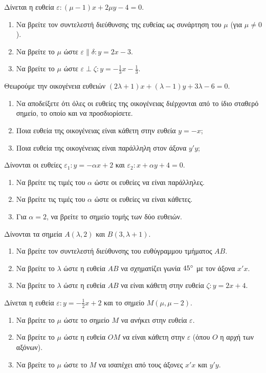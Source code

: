 \documentclass[11pt,a4paper,modern]{FFExercises}
\begin{document}
\askhsh
Δίνεται η ευθεία $ \varepsilon: (\mu-1)x + 2\mu y - 4 = 0 $.
\begin{enumerate}[itemsep=0mm,label=\alph*.]
	\item Να βρείτε τον συντελεστή διεύθυνσης της ευθείας ως συνάρτηση του $\mu$ (για $\mu \neq 0$).
	\item Να βρείτε το $\mu$ ώστε $ \varepsilon \parallel \delta: y = 2x - 3 $.
	\item Να βρείτε το $\mu$ ώστε $ \varepsilon \perp \zeta: y = -\frac{1}{3}x - \frac{1}{3} $.
\end{enumerate}

\askhsh
Θεωρούμε την οικογένεια ευθειών $ (2\lambda+1)x + (\lambda-1)y + 3\lambda - 6 = 0 $.
\begin{enumerate}[itemsep=0mm,label=\alph*.]
	\item Να αποδείξετε ότι όλες οι ευθείες της οικογένειας διέρχονται από το ίδιο σταθερό σημείο, το οποίο και να προσδιορίσετε.
	\item Ποια ευθεία της οικογένειας είναι κάθετη στην ευθεία $ y = -x $;
	\item Ποια ευθεία της οικογένειας είναι παράλληλη στον άξονα $y'y$;
\end{enumerate}

\askhsh
Δίνονται οι ευθείες $ \varepsilon_1: y = -\alpha x + 2 $ και $ \varepsilon_2: x + \alpha y + 4 = 0 $.
\begin{enumerate}[itemsep=0mm,label=\alph*.]
	\item Να βρείτε τις τιμές του $\alpha$ ώστε οι ευθείες να είναι παράλληλες.
	\item Να βρείτε τις τιμές του $\alpha$ ώστε οι ευθείες να είναι κάθετες.
	\item Για $ \alpha = 2 $, να βρείτε το σημείο τομής των δύο ευθειών.
\end{enumerate}

\askhsh
Δίνονται τα σημεία $ A(\lambda, 2) $ και $ B(3, \lambda+1) $.
\begin{enumerate}[itemsep=0mm,label=\alph*.]
	\item Να βρείτε τον συντελεστή διεύθυνσης του ευθύγραμμου τμήματος $ AB $.
	\item Να βρείτε το $\lambda$ ώστε η ευθεία $ AB $ να σχηματίζει γωνία $ 45\degree $ με τον άξονα $ x'x $.
	\item Να βρείτε το $\lambda$ ώστε η ευθεία $ AB $ να είναι κάθετη στην ευθεία $ \zeta: y = 2x + 4 $.
\end{enumerate}

\askhsh
Δίνεται η ευθεία $ \varepsilon: y = -\frac{1}{2}x + 2 $ και το σημείο $ M( \mu, \mu-2 ) $.
\begin{enumerate}[itemsep=0mm,label=\alph*.]
	\item Να βρείτε το $\mu$ ώστε το σημείο $M$ να ανήκει στην ευθεία $\varepsilon$.
	\item Να βρείτε το $\mu$ ώστε η ευθεία $OM$ να είναι κάθετη στην $\varepsilon$ (όπου $O$ η αρχή των αξόνων).
	\item Να βρείτε το $\mu$ ώστε το $M$ να ισαπέχει από τους άξονες $ x'x $ και $ y'y $.
\end{enumerate}
\end{document}
